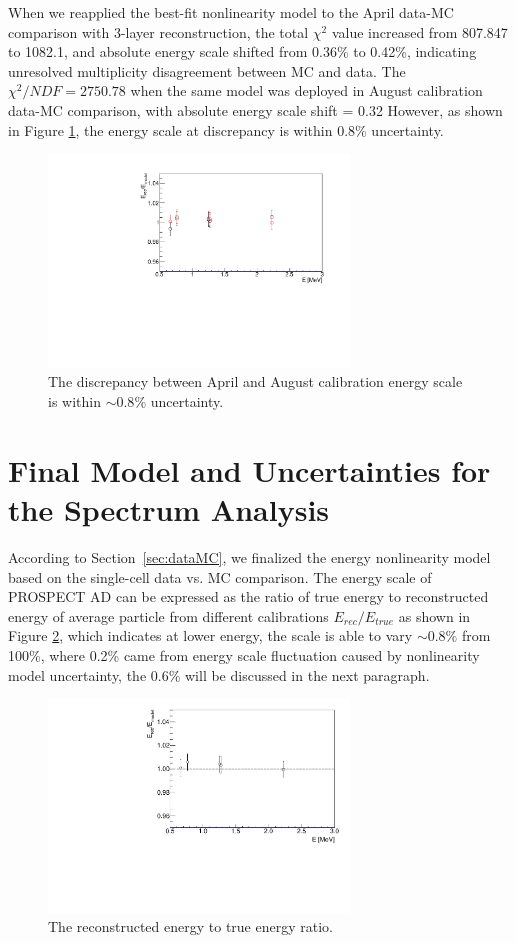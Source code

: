 When we reapplied the best-fit nonlinearity model to the April data-MC comparison with 3-layer reconstruction, the total $\chi^2$ value increased from 807.847 to 1082.1, and absolute energy scale shifted from 0.36\% to 0.42\%, indicating unresolved multiplicity disagreement between MC and data.
The $\chi^2/NDF = 2750.78$ when the same model was deployed in August calibration data-MC comparison, with absolute energy scale shift = 0.32
However, as shown in Figure \ref{fig:compare}, the energy scale at discrepancy is within 0.8\% uncertainty.

\begin{figure}[h!]
\centering
\includegraphics[width=80mm]{Figures/EScaleCompare.pdf}
\caption{The discrepancy between April and August calibration energy scale is within $\sim0.8\%$ uncertainty.}
\label{fig:compare}
\end{figure}

\newpage

\section{Final Model and Uncertainties for the Spectrum Analysis}
According to Section~\ref{sec:dataMC}, we finalized the energy nonlinearity model based on the single-cell data vs. MC comparison.
The energy scale of PROSPECT AD can be expressed as the ratio of true energy to reconstructed energy of average particle from different calibrations $E_{rec}/E_{true}$ as shown in Figure \ref{fig:escale}, which indicates at lower energy, the scale is able to vary $\sim0.8\%$ from 100\%, where 0.2\% came from energy scale fluctuation caused by nonlinearity model uncertainty, the 0.6\% will be discussed in the next paragraph.

\begin{figure}[h!]
\centering
\includegraphics[width=80mm]{Figures/EScale.pdf}
\caption{The reconstructed energy to true energy ratio.}
\label{fig:escale}
\end{figure}

